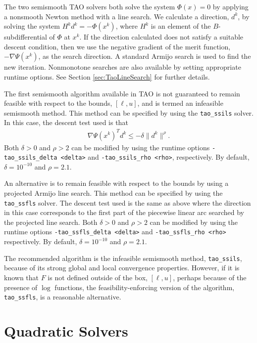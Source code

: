 The two semismooth TAO solvers both solve the system $\Phi(x) = 0$ by applying
a nonsmooth Newton method with a line search.  We calculate a direction, $d^k$,
by solving the system $H^kd^k = -\Phi(x^k)$, where $H^k$ is an element of the 
$B$-subdifferential \cite{qi.sun:nonsmooth} of $\Phi$ at $x^k$.  If the 
direction calculated does not satisfy a suitable descent condition, then 
we use the negative gradient of the merit function, $-\nabla \Psi(x^k)$, as 
the search direction.  A standard Armijo search \cite{armijo:minimization} is
used to find the new iteration.  Nonmonotone searches 
\cite{grippo.lampariello.ea:nonmonotone} are also available by setting 
appropriate runtime options.  See Section \ref{sec:TaoLineSearch} for further 
details.

The first semismooth algorithm available in TAO is not guaranteed to 
remain feasible with respect to the bounds, $[\ell, u]$, and is termed 
an infeasible semismooth method.  This method can be specified by using the 
{\tt tao\_ssils} solver.  In this case, the descent test used is 
that
\begin{eqnarray*}
\nabla \Psi(x^k)^Td^k \leq -\delta\| d^k \|^\rho.
\end{eqnarray*}
Both $\delta > 0$ and $\rho > 2$ can be modified by using the
runtime options {\tt -tao\_ssils\_delta <delta>} and 
{\tt -tao\_ssils\_rho <rho>}, respectively. By default, 
$\delta = 10^{-10}$ and $\rho = 2.1$.

An alternative is to remain feasible with respect to the bounds by using a 
projected Armijo line search.  This method can be specified by using the 
{\tt tao\_ssfls} solver.  The descent test used is the same as above 
where the direction in this case corresponds to the first part of the 
piecewise linear arc searched by the projected line search.  
Both $\delta > 0$ and $\rho > 2$ can be modified by using the runtime 
options  {\tt -tao\_ssfls\_delta <delta>} and {\tt -tao\_ssfls\_rho <rho>} 
respectively.  By default, $\delta = 10^{-10}$ and $\rho = 2.1$.

The recommended algorithm is the infeasible semismooth method,
{\tt tao\_ssils}, because of its strong global and local convergence 
properties.  However, if it is known that $F$ is not defined outside 
of the box, $[\ell,u]$, perhaps because of the presence of $\log$ functions,
the feasibility-enforcing version of the algorithm, {\tt tao\_ssfls}, is a 
reasonable alternative.

\section{Quadratic Solvers}

